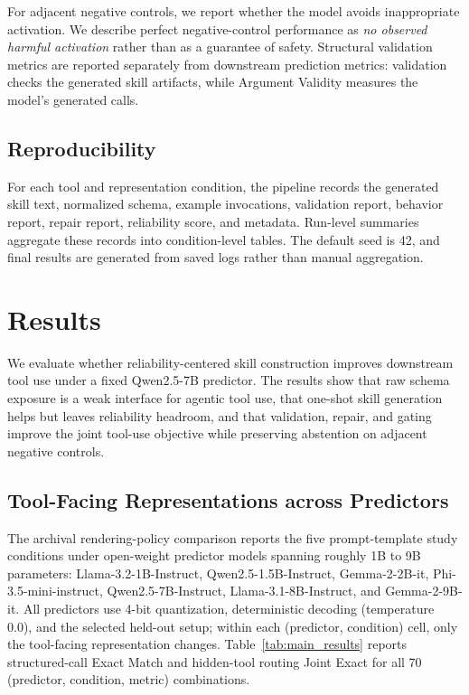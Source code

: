 \documentclass[11pt]{article}
\begin{document}
For adjacent negative controls, we report whether the model avoids inappropriate activation. We describe perfect negative-control performance as \emph{no observed harmful activation} rather than as a guarantee of safety. Structural validation metrics are reported separately from downstream prediction metrics: validation checks the generated skill artifacts, while Argument Validity measures the model's generated calls.

\subsection{Reproducibility}
\label{subsec:reproducibility}

For each tool and representation condition, the pipeline records the generated skill text, normalized schema, example invocations, validation report, behavior report, repair report, reliability score, and metadata. Run-level summaries aggregate these records into condition-level tables. The default seed is 42, and final results are generated from saved logs rather than manual aggregation.


\section{Results}
\label{sec:results}

We evaluate whether reliability-centered skill construction improves downstream tool use under a fixed Qwen2.5-7B predictor. The results show that raw schema exposure is a weak interface for agentic tool use, that one-shot skill generation helps but leaves reliability headroom, and that validation, repair, and gating improve the joint tool-use objective while preserving abstention on adjacent negative controls.

\subsection{Tool-Facing Representations across Predictors}
\label{subsec:main_results}

The archival rendering-policy comparison reports the five prompt-template study conditions under open-weight predictor models spanning roughly 1B to 9B parameters: Llama-3.2-1B-Instruct, Qwen2.5-1.5B-Instruct, Gemma-2-2B-it, Phi-3.5-mini-instruct, Qwen2.5-7B-Instruct, Llama-3.1-8B-Instruct, and Gemma-2-9B-it. All predictors use 4-bit quantization, deterministic decoding (temperature 0.0), and the selected held-out setup; within each (predictor, condition) cell, only the tool-facing representation changes. Table~\ref{tab:main_results} reports structured-call Exact Match and hidden-tool routing Joint Exact for all 70 (predictor, condition, metric) combinations.
\end{document}
